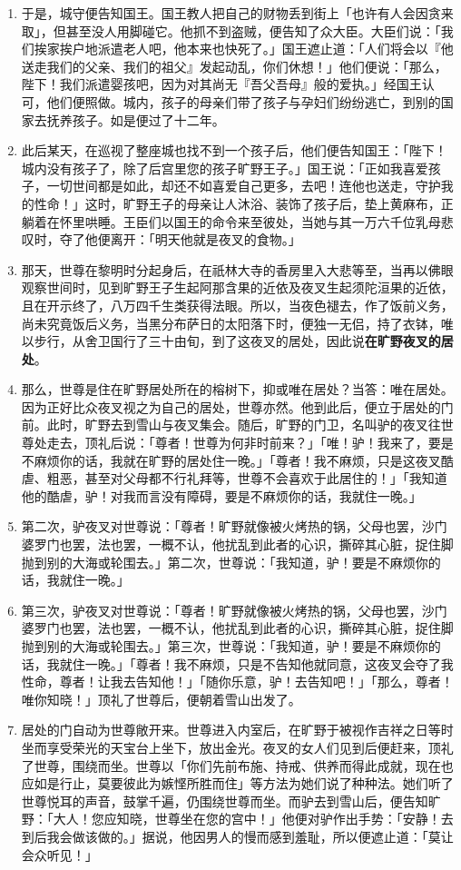 \begin{enumerate}
\item 于是，城守便告知国王。国王教人把自己的财物丢到街上「也许有人会因贪来取」，但甚至没人用脚碰它。他抓不到盗贼，便告知了众大臣。大臣们说：「我们挨家挨户地派遣老人吧，他本来也快死了。」国王遮止道：「人们将会以『他送走我们的父亲、我们的祖父』发起动乱，你们休想！」他们便说：「那么，陛下！我们派遣婴孩吧，因为对其尚无『吾父吾母』般的爱执。」经国王认可，他们便照做。城内，孩子的母亲们带了孩子与孕妇们纷纷逃亡，到别的国家去抚养孩子。如是便过了十二年。
\item 此后某天，在巡视了整座城也找不到一个孩子后，他们便告知国王：「陛下！城内没有孩子了，除了后宫里您的孩子旷野王子。」国王说：「正如我喜爱孩子，一切世间都是如此，却还不如喜爱自己更多，去吧！连他也送走，守护我的性命！」这时，旷野王子的母亲让人沐浴、装饰了孩子后，垫上黄麻布，正躺着在怀里哄睡。王臣们以国王的命令来至彼处，当她与其一万六千位乳母悲叹时，夺了他便离开：「明天他就是夜叉的食物。」
\item 那天，世尊在黎明时分起身后，在祇林大寺的香房里入大悲等至，当再以佛眼观察世间时，见到旷野王子生起阿那含果的近依及夜叉生起须陀洹果的近依，且在开示终了，八万四千生类获得法眼。所以，当夜色褪去，作了饭前义务，尚未究竟饭后义务，当黑分布萨日的太阳落下时，便独一无侣，持了衣钵，唯以步行，从舍卫国行了三十由旬，到了这夜叉的居处，因此说\textbf{在旷野夜叉的居处}。
\item 那么，世尊是住在旷野居处所在的榕树下，抑或唯在居处？当答：唯在居处。因为正好比众夜叉视之为自己的居处，世尊亦然。他到此后，便立于居处的门前。此时，旷野去到雪山与夜叉集会。随后，旷野的门卫，名叫驴的夜叉往世尊处走去，顶礼后说：「尊者！世尊为何非时前来？」「唯！驴！我来了，要是不麻烦你的话，我就在旷野的居处住一晚。」「尊者！我不麻烦，只是这夜叉酷虐、粗恶，甚至对父母都不行礼拜等，世尊不会喜欢于此居住的！」「我知道他的酷虐，驴！对我而言没有障碍，要是不麻烦你的话，我就住一晚。」
\item 第二次，驴夜叉对世尊说：「尊者！旷野就像被火烤热的锅，父母也罢，沙门婆罗门也罢，法也罢，一概不认，他扰乱到此者的心识，撕碎其心脏，捉住脚抛到别的大海或轮围去。」第二次，世尊说：「我知道，驴！要是不麻烦你的话，我就住一晚。」
\item 第三次，驴夜叉对世尊说：「尊者！旷野就像被火烤热的锅，父母也罢，沙门婆罗门也罢，法也罢，一概不认，他扰乱到此者的心识，撕碎其心脏，捉住脚抛到别的大海或轮围去。」第三次，世尊说：「我知道，驴！要是不麻烦你的话，我就住一晚。」「尊者！我不麻烦，只是不告知他就同意，这夜叉会夺了我性命，尊者！让我去告知他！」「随你乐意，驴！去告知吧！」「那么，尊者！唯你知晓！」顶礼了世尊后，便朝着雪山出发了。
\item 居处的门自动为世尊敞开来。世尊进入内室后，在旷野于被视作吉祥之日等时坐而享受荣光的天宝台上坐下，放出金光。夜叉的女人们见到后便赶来，顶礼了世尊，围绕而坐。世尊以「你们先前布施、持戒、供养而得此成就，现在也应如是行止，莫要彼此为嫉悭所胜而住」等方法为她们说了种种法。她们听了世尊悦耳的声音，鼓掌千遍，仍围绕世尊而坐。而驴去到雪山后，便告知旷野：「大人！您应知晓，世尊坐在您的宫中！」他便对驴作出手势：「安静！去到后我会做该做的。」据说，他因男人的慢而感到羞耻，所以便遮止道：「莫让会众听见！」

\end{enumerate}
